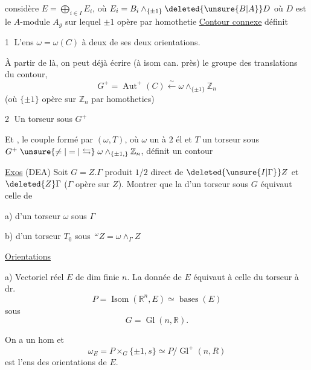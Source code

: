 considère $E=\bigoplus_{i\in I}E_i$, où $E_i=B_i\wedge_{\{\pm1\}}\deleted{\unsure{B|A}}D$ où $D$ est le $A$-module $A_g$ sur lequel $\pm1$ opère par homothetie
\uline{Contour  connexe}  définit

\textcircled{1} L'ens $\omega=\omega(C)$ à deux  de ses deux orientations.

À partir de là, on peut déjà écrire (à isom can. près) le groupe des translations du contour, 
\[
 G^+=\operatorname{Aut}^+(C)\xleftarrow{\sim}\omega\wedge_{\{\pm1\}}\mathbb Z_n
\]
(où $\{\pm1\}$ opère sur $\mathbb Z_n$ par homotheties)

\textcircled{2} Un torseur sous $G^+$

 Et , le couple formé par $(\omega,T)$, où $\omega$ un  à $2$ él et $T$ un torseur sous $G^+\mathrel{\unsure{\ne|=|\leftrightarrows}}\omega\wedge_{\{\pm1,\}}\mathbb Z_n$, définit un
contour

\uline{Exos} (DEA) Soit $G=Z.\Gamma$ produit $1/2$ direct de $\deleted{\unsure{I|\Gamma}}Z$ et $\deleted{Z}\Gamma$ ($\Gamma$ opère sur $Z$). Montrer que la  d'un torseur  sous $G$ équivaut  celle de

a) d'un torseur $\omega$ sous $\Gamma$

b) d'un torseur $T_0$ sous $\,{}^\omega Z=\omega\wedge_\Gamma Z$

\uline{Orientations}

a) Vectoriel réel $E$ de dim finie $n$. La donnée de $E$ équivaut à celle du torseur à dr.
\[
 P=\operatorname{Isom}(\mathbb R^n,E)\simeq\operatorname{bases}(E)
\]
sous
\[
 G=\operatorname{Gl}(n,\mathbb R).
\]

On a un hom
et
\[
 \omega_E=P\times_G\{\pm1,s\}\simeq P/\operatorname{Gl}^+(n,R)
\]
est l'ens des orientations de $E$.

